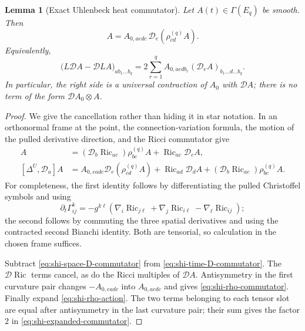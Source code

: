 \documentclass[10pt]{coll-l}
\newtheorem{lemma}[theorem]{Lemma}
\theoremstyle{definition}
\theoremstyle{remark}
\numberwithin{section}{chapter}
\numberwithin{equation}{chapter}
\newcommand{\Ric}{\operatorname{Ric}}
\begin{document}
\begin{lemma}[Exact Uhlenbeck heat commutator]
\label{lem:shi-exact-commutator}
Let $A(t)\in\Gamma(E_q)$ be smooth.  Then
\begin{equation}
 [L,\mathcal D_a]A
    =A_{0,aedc}\,\mathcal D_e(\rho_{cd}^{(q)}A).          \label{eq:shi-rho-commutator}
\end{equation}
Equivalently,
\begin{equation}
 \bigl(L\mathcal DA-\mathcal DLA\bigr)_{a b_1\ldots b_q}
  =2\sum_{r=1}^q
       A_{0,aedb_r}
       (\mathcal D_eA)_{b_1\ldots d\ldots b_q}.          \label{eq:shi-expanded-commutator}
\end{equation}
In particular, the right side is a universal contraction of $A_0$ with
$\mathcal DA$; there is no term of the form
$\mathcal DA_0\otimes A$.
\end{lemma}

\begin{proof}
We give the cancellation rather than hiding it in star notation.  In an
orthonormal frame at the point, the connection-variation formula, the motion
of the pulled derivative direction, and the Ricci commutator give
\begin{align}
 [\partial_t,\mathcal D_a]A
   &=(\mathcal D_b\Ric_{ac})\rho_{bc}^{(q)}A
        +\Ric_{ac}\mathcal D_cA,                         \label{eq:shi-time-D-commutator}\\
 [\Delta^U,\mathcal D_a]A
   &=A_{0,eadc}\mathcal D_e(\rho_{cd}^{(q)}A)
       +\Ric_{ad}\mathcal D_dA
       +(\mathcal D_b\Ric_{ac})\rho_{bc}^{(q)}A.         \label{eq:shi-space-D-commutator}
\end{align}
For completeness, the first identity follows by differentiating the pulled
Christoffel symbols and using
\[
 \partial_t\Gamma^k_{ij}
   =-g^{k\ell}
      (\nabla_i\Ric_{j\ell}+\nabla_j\Ric_{i\ell}
                         -\nabla_\ell\Ric_{ij});
\]
the second follows by commuting the three spatial derivatives and using the
contracted second Bianchi identity.  Both are tensorial, so calculation in
the chosen frame suffices.

Subtract \eqref{eq:shi-space-D-commutator} from
\eqref{eq:shi-time-D-commutator}.  The $\mathcal D\Ric$ terms cancel, as do
the Ricci multiples of $\mathcal DA$.  Antisymmetry in the first curvature
pair changes $-A_{0,eadc}$ into $A_{0,aedc}$ and gives
\eqref{eq:shi-rho-commutator}.  Finally expand
\eqref{eq:shi-rho-action}.  The two terms belonging to each tensor slot are
equal after antisymmetry in the last curvature pair; their sum gives the
factor $2$ in \eqref{eq:shi-expanded-commutator}.
\end{proof}
\end{document}
